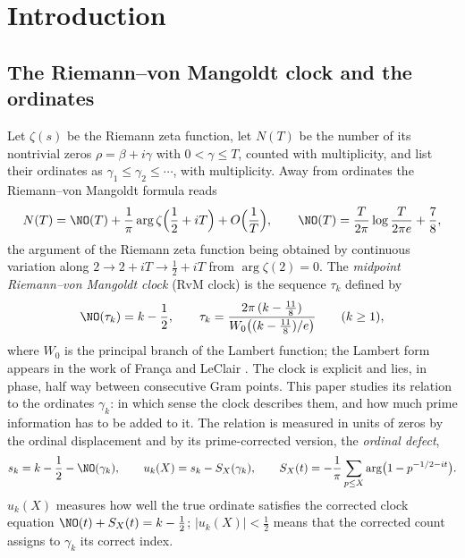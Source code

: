\tableofcontents

\section{Introduction}
\label{sec:introduction}

\subsection{The Riemann--von Mangoldt clock and the ordinates}
\label{subsec:clock_intro}
Let $\zeta(s)$ be the Riemann zeta function, let $N(T)$ be the number of its nontrivial zeros $\rho=\beta+i\gamma$ with $0<\gamma\le T$, counted with multiplicity, and list their ordinates as $\gamma_1\le\gamma_2\le\cdots$, with multiplicity. Away from ordinates the Riemann--von Mangoldt formula reads \cite[\S\S9.3--9.4]{Titchmarsh1986}
\begin{equation}
 N(T)=\NO(T)+\frac1\pi\arg\zeta\Bigl(\frac12+iT\Bigr)+O\Bigl(\frac1T\Bigr),\qquad \NO(T)=\frac{T}{2\pi}\log\frac{T}{2\pi e}+\frac78,
 \label{eq:intro_rvm}
\end{equation}
the argument of the Riemann zeta function being obtained by continuous variation along $2\to2+iT\to\frac12+iT$ from $\arg\zeta(2)=0$. The \emph{midpoint Riemann--von Mangoldt clock} (RvM clock) is the sequence $\tau_k$ defined by
\begin{equation}
 \NO(\tau_k)=k-\frac12,\qquad \tau_k=\frac{2\pi\,(k-\frac{11}8)}{W_0\bigl((k-\frac{11}8)/e\bigr)}\qquad(k\ge1),
 \label{eq:intro_clock}
\end{equation}
where $W_0$ is the principal branch of the Lambert function; the Lambert form appears in the work of Fran\c{c}a and LeClair \cite{FrancaLeClair2014,FrancaLeClair2015}. The clock is explicit and lies, in phase, half way between consecutive Gram points. This paper studies its relation to the ordinates $\gamma_k$: in which sense the clock describes them, and how much prime information has to be added to it. The relation is measured in units of zeros by the ordinal displacement and by its prime-corrected version, the \emph{ordinal defect},
\begin{equation}
 s_k=k-\frac12-\NO(\gamma_k),\qquad u_k(X)=s_k-S_X(\gamma_k),\qquad S_X(t)=-\frac1\pi\sum_{p\le X}\arg\bigl(1-p^{-1/2-it}\bigr).
 \label{eq:intro_defect}
\end{equation}
$u_k(X)$ measures how well the true ordinate satisfies the corrected clock equation $\NO(t)+S_X(t)=k-\frac12$; $|u_k(X)|<\frac12$ means that the corrected count assigns to $\gamma_k$ its correct index.


